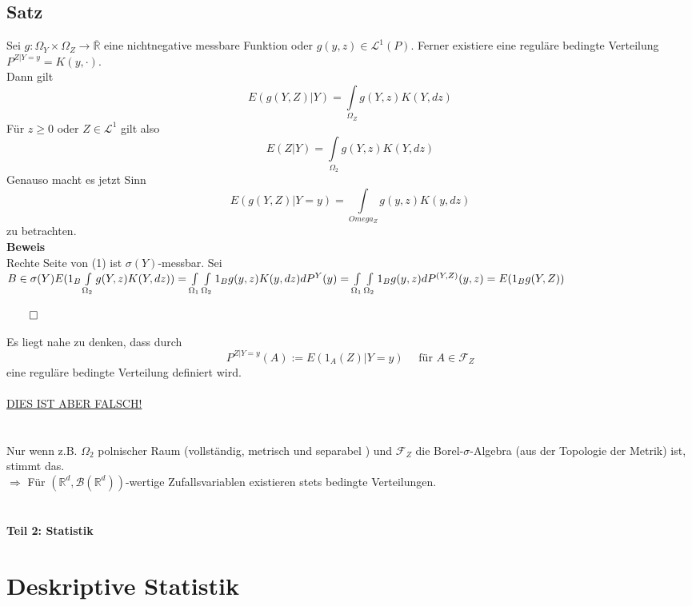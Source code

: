\documentclass[german,10pt,oneside, fleqn, a4paper]{article}
\newcommand {\R}	{\mathbb{R}}
\newcommand{\Ra}	{\Rightarrow}
\newcommand{\ra}{\rightarrow}
\newcommand{\brc}[1]{\left(#1\right)}
\newcommand{\QED}{\begin{flushright}$\qed$\end{flushright}}
\newcommand{\mc}[1]{\mathcal{#1}}
\newcommand{\lp}[1]{\mc{L}^{#1}}
\newcommand{\beweis}{\textbf{Beweis}\\}
\newcommand{\1}[1]{1_{#1}}
\newcommand{\2}[1]{\1{\brac{#1}}}
\newcommand{\rbor}[1][d]{\brc{\R^{#1},\mc{B}\brc{\R^{#1}}}}
\newcommand{\f}{\mc{F}}
\begin{document}
\subsection{Satz}
\label{7.6}
Sei $g:\Omega_Y\times\Omega_Z\ra\overline{\R}$ eine nichtnegative messbare Funktion oder $g(y,z)\in\lp{1}(P).$ Ferner existiere eine reguläre bedingte Verteilung $P^{Z|Y=y}=K(y,\cdot).$\\
Dann gilt\begin{equation}
E(g(Y,Z)|Y)=\int\limits_{\Omega_Z}g(Y,z)K(Y,dz)
\end{equation}
Für $z\geq0$ oder $Z\in\lp{1}$ gilt also \[
E(Z|Y)=\int\limits_{\Omega_2}g(Y,z)K(Y,dz)\]
Genauso macht es jetzt Sinn \[
E(g(Y,Z)|Y=y)=\int\limits_{Omega_Z}g(y,z)K(y,dz)\]
zu betrachten.\\
\beweis
Rechte Seite von (1) ist $\sigma(Y)$-messbar. Sei $B\in\sigma(Y)\\
E(1_B\int\limits_{\Omega_2}g(Y,z)K(Y,dz))=\int\limits_{\Omega_1}\int\limits_{\Omega_2}1_Bg(y,z)K(y,dz)dP^Y(y)\\
=\int\limits_{\Omega_1}\int\limits_{\Omega_2}1_Bg(y,z)dP^{(Y,Z)}(y,z)=E(1_Bg(Y,Z))$\QED

Es liegt nahe zu denken, dass durch \[
P^{Z|Y=y}(A):=E(1_A(Z)|Y=y)\quad\text{ für } A\in\f_Z\]
eine reguläre bedingte Verteilung definiert wird.\\
\\

\underline{\large{DIES IST ABER FALSCH!}}\\
\\
\\
Nur wenn z.B. $\Omega_2$ polnischer Raum (vollständig, metrisch und separabel%
) und $\f_Z$ die Borel-$\sigma$-Algebra (aus der Topologie der Metrik) ist, stimmt das.\\
$\Ra$ Für $\rbor$-wertige Zufallsvariablen existieren stets bedingte Verteilungen.
\\
\\
\\






\textbf{\huge{Teil 2: Statistik}}
\section{Deskriptive Statistik}
\end{document}

